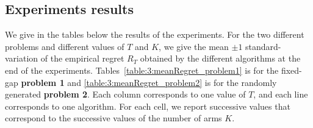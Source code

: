 \subsection{Experiments results}

We give in the tables below the results of the experiments. For the two different problems and different values of $T$ and $K$, we give the mean $\pm 1$ standard-variation of the empirical regret $R_T$ obtained by the different algorithms at the end of the experiments.
Tables~\ref{table:3:meanRegret_problem1} is for the fixed-gap \textbf{problem 1}
and \ref{table:3:meanRegret_problem2} is for the randomly generated \textbf{problem 2}.
Each column corresponds to one value of $T$, and each line corresponds to one algorithm.
For each cell, we report successive values that correspond to the successive values of the number of arms $K$.




